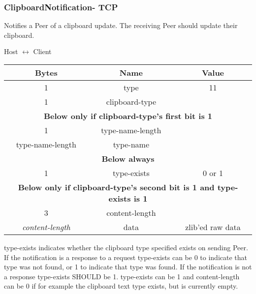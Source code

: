 \subsubsection{ClipboardNotification- TCP}

Notifies a Peer of a clipboard update. The receiving Peer should update their clipboard.

\begin{center}
    Host $\leftrightarrow$ Client\\
    \begin{tabular}{|c|c|c|}
        \hline
        \textbf{Bytes}        & \textbf{Name}    & \textbf{Value}   \\
        \hline
        1                     & type             & 11               \\
        \hline
        1                     & clipboard-type   &                  \\
        \hline
        \multicolumn{3}{|c|}{\textbf{Below only if clipboard-type's first bit is 1} } \\
        \hline
        1                     & type-name-length &                  \\
        \hline
        type-name-length      & type-name        &                  \\
        \hline
        \multicolumn{3}{|c|}{\textbf{Below always} } \\
        \hline
        1                     & type-exists      & 0 or 1           \\
        \hline
        \multicolumn{3}{|c|}{\textbf{Below only if clipboard-type's second bit is 1 and type-exists is 1} }
        \\
        \hline
        3 & content-length             & \\
        \hline
        \emph{content-length} & data             & zlib'ed raw data \\
        \hline
    \end{tabular}
\end{center}

type-exists indicates whether the clipboard type specified exists on sending Peer.
If the notification is a response to a request type-exists can be 0 to indicate that type was not found, or 1 to indicate that type was found.
If the notification is not a response type-exists SHOULD be 1.
type-exists can be 1 and content-length can be 0 if for example the clipboard text type exists, but is currently empty.

